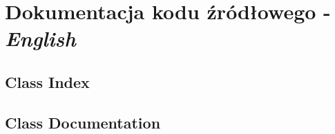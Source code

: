 \documentclass[11pt]{article}
\newcommand{\+}{\discretionary{\mbox{\scriptsize$\hookleftarrow$}}{}{}}
\begin{document}
\section{Dokumentacja kodu źródłowego - \textit{English}}
\subsection{Class Index}

\subsection{Class Documentation}
 
   
\end{document}
